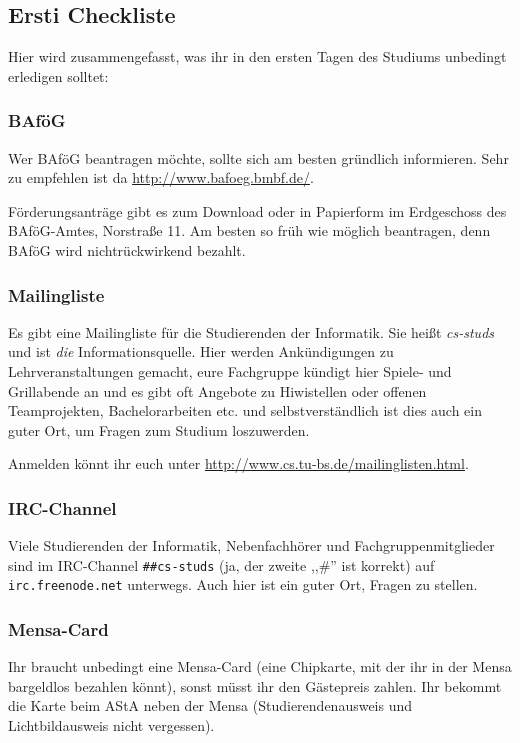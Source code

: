 
\subsection{Ersti Checkliste}

Hier wird zusammengefasst, was ihr in den ersten Tagen des Studiums
unbedingt erledigen solltet:

\subsubsection{BAf\"oG}

Wer BAf\"oG beantragen m\"ochte, sollte sich am besten gr\"undlich
informieren. Sehr zu empfehlen ist da \url{http://www.bafoeg.bmbf.de/}.

F\"orderungsantr\"age gibt es zum Download oder in Papierform im
Erdgeschoss des BAf\"oG-Amtes, Norstra\ss e 11. Am besten so fr\"uh
wie m\"oglich beantragen, denn BAf\"oG wird nichtr\"uckwirkend bezahlt.

\subsubsection{Mailingliste}

Es gibt eine Mailingliste f\"ur die Studierenden der Informatik.
Sie heißt \emph{cs-studs} und ist \emph{die} Informationsquelle.
Hier werden Ank\"undigungen zu Lehrveranstaltungen gemacht, eure
Fachgruppe k\"undigt hier Spiele- und Grillabende an und es gibt
oft Angebote zu Hiwistellen oder offenen Teamprojekten,
Bachelorarbeiten etc. und selbstverst\"andlich ist dies auch ein
guter Ort, um Fragen zum Studium loszuwerden.

Anmelden k\"onnt ihr euch unter
\url{http://www.cs.tu-bs.de/mailinglisten.html}.

\subsubsection{IRC-Channel}

Viele Studierenden der Informatik, Nebenfachh\"orer und
Fachgruppenmitglieder sind im IRC-Channel \texttt{\#\#cs-studs}
(ja, der zweite ,,\#'' ist korrekt) auf \texttt{irc.freenode.net}
unterwegs. Auch hier ist ein guter Ort, Fragen zu stellen.

\subsubsection{Mensa-Card}

Ihr braucht unbedingt eine Mensa-Card (eine Chipkarte,
mit der ihr in der Mensa bargeldlos bezahlen k\"onnt), sonst
m\"usst ihr den G\"astepreis zahlen. Ihr bekommt die Karte beim
AStA neben der Mensa (Studierendenausweis und Lichtbildausweis
nicht vergessen).

